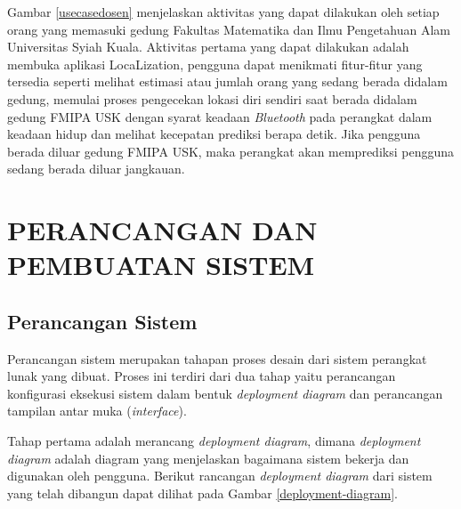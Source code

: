 \par Gambar \ref{usecasedosen} menjelaskan aktivitas yang dapat dilakukan oleh setiap orang yang memasuki gedung Fakultas Matematika dan Ilmu Pengetahuan Alam Universitas Syiah Kuala. Aktivitas pertama yang dapat dilakukan adalah membuka aplikasi LocaLization, pengguna dapat menikmati fitur-fitur yang tersedia seperti melihat estimasi atau jumlah orang yang sedang berada didalam gedung, memulai proses pengecekan lokasi diri sendiri saat berada didalam gedung FMIPA USK dengan syarat keadaan \textit{Bluetooth} pada perangkat dalam keadaan hidup dan melihat kecepatan prediksi berapa detik. Jika pengguna berada diluar gedung FMIPA USK, maka perangkat akan memprediksi pengguna sedang berada diluar jangkauan.


\section{PERANCANGAN DAN PEMBUATAN SISTEM}

\subsection{Perancangan Sistem}
\par Perancangan sistem merupakan tahapan proses desain dari sistem perangkat lunak yang dibuat. Proses ini terdiri dari dua tahap yaitu perancangan konfigurasi eksekusi sistem dalam bentuk \textit{deployment diagram} dan perancangan tampilan antar muka (\textit{interface}).

Tahap pertama adalah merancang \textit{deployment diagram}, dimana \textit{deployment diagram} adalah diagram yang menjelaskan bagaimana sistem bekerja dan digunakan oleh pengguna. Berikut rancangan \textit{deployment diagram} dari sistem yang telah dibangun dapat dilihat pada Gambar \ref{deployment-diagram}.


